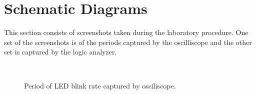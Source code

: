 \documentclass[aps,letterpaper,10pt]{revtex4}
\begin{document}
\newpage
\section{Schematic Diagrams}
This section consists of screenshots taken during the laboratory procedure.  One set of the screenshots is of the periods captured by the oscilliscope and the other set is captured by the logic analyzer.

	\begin{figure}[H]
	  \centering
	   \\
	  \caption{Period of LED blink rate captured by osciliscope.}
	  \label{fig:oscil}
	\end{figure}
\end{document}
